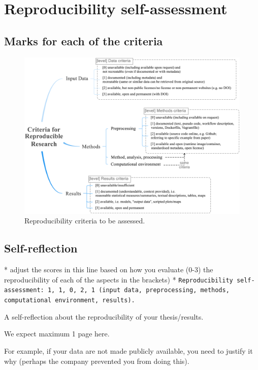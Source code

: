 

\chapter{Reproducibility self-assessment}

\section{Marks for each of the criteria}

\begin{figure}[h]
  \centering
  \includegraphics[width=0.65\linewidth]{figs/reproducibility_criteria.png}
  \caption{Reproducibility criteria to be assessed.}
\label{fig:reproducibility_criteria}
\end{figure}


\section{Self-reflection} 

* adjust the scores in this line based on how you evaluate (0-3) the reproducibility of each of the aspects in the brackets) *
\texttt{Reproducibility self-assessment: 1, 1, 0, 2, 1 (input data, preprocessing, methods, computational environment, results).}

A self-reflection about the reproducibility of your thesis/results.

We expect maximum 1 page here.

For example, if your data are not made publicly available, you need to justify it why (perhaps the company prevented you from doing this).
